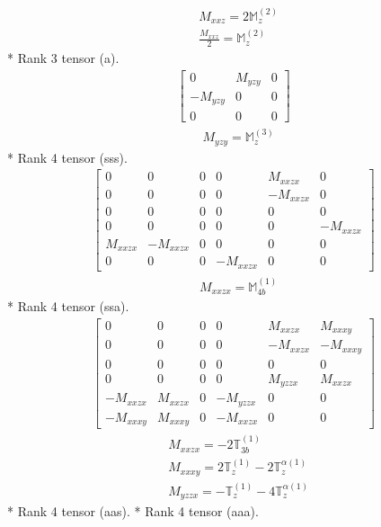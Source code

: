 \documentclass[fleqn,8pt,landscape]{jsarticle}
\begin{document}
\begin{align*}
& M_{xxz} = 2 \mathbb{M}_{z}^{(2)} \\
& \frac{M_{xxz}}{2} = \mathbb{M}_{z}^{(2)}
\end{align*}
* Rank 3 tensor (a).
\begin{align*}
\begin{bmatrix} 0 & M_{yzy} & 0 \\ - M_{yzy} & 0 & 0 \\ 0 & 0 & 0 \end{bmatrix}
\end{align*}
\begin{align*}
& M_{yzy} = \mathbb{M}_{z}^{(3)}
\end{align*}
* Rank 4 tensor (sss).
\begin{align*}
\begin{bmatrix} 0 & 0 & 0 & 0 & M_{xxzx} & 0 \\ 0 & 0 & 0 & 0 & - M_{xxzx} & 0 \\ 0 & 0 & 0 & 0 & 0 & 0 \\ 0 & 0 & 0 & 0 & 0 & - M_{xxzx} \\ M_{xxzx} & - M_{xxzx} & 0 & 0 & 0 & 0 \\ 0 & 0 & 0 & - M_{xxzx} & 0 & 0 \end{bmatrix}
\end{align*}
\begin{align*}
& M_{xxzx} = \mathbb{M}_{4b}^{(1)}
\end{align*}
* Rank 4 tensor (ssa).
\begin{align*}
\begin{bmatrix} 0 & 0 & 0 & 0 & M_{xxzx} & M_{xxxy} \\ 0 & 0 & 0 & 0 & - M_{xxzx} & - M_{xxxy} \\ 0 & 0 & 0 & 0 & 0 & 0 \\ 0 & 0 & 0 & 0 & M_{yzzx} & M_{xxzx} \\ - M_{xxzx} & M_{xxzx} & 0 & - M_{yzzx} & 0 & 0 \\ - M_{xxxy} & M_{xxxy} & 0 & - M_{xxzx} & 0 & 0 \end{bmatrix}
\end{align*}
\begin{align*}
& M_{xxzx} = - 2 \mathbb{T}_{3b}^{(1)} \\
& M_{xxxy} = 2 \mathbb{T}_{z}^{(1)} - 2 \mathbb{T}_{z}^{\alpha(1)} \\
& M_{yzzx} = - \mathbb{T}_{z}^{(1)} - 4 \mathbb{T}_{z}^{\alpha(1)}
\end{align*}
* Rank 4 tensor (aas).
* Rank 4 tensor (aaa).
\end{document}
